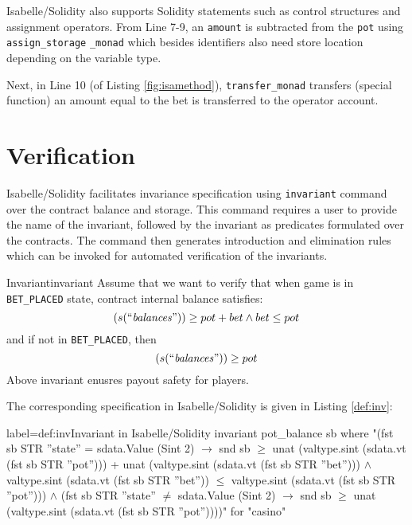 \documentclass[a4paper,UKenglish,cleveref, autoref, thm-restate]{oasics-v2021}
\begin{document}
Isabelle/Solidity also supports Solidity statements such as control structures and assignment operators. 
%
From Line 7-9, an \texttt{amount} is subtracted from the \texttt{pot} using \texttt{assign\_storage} \texttt{\_monad} which besides identifiers also need store location depending on the variable type.
%

%
Next, 
%
in Line 10 (of Listing \ref{fig:isamethod}), \texttt{transfer\_monad} transfers (special function) an amount  equal to the bet is transferred to the operator account.
\section{Verification}
%
%
%
Isabelle/Solidity facilitates invariance specification using \texttt{\color{isarblue}invariant} command over the contract balance and storage.
%
This command requires a user to provide the name of the invariant, followed by the invariant as predicates formulated over the contracts. The command then generates introduction and elimination rules which can be invoked for automated verification of the invariants.
%
\begin{Example}{Invariant}{invariant}
	Assume that we want to verify that when game is in  \texttt{BET\_PLACED} state, contract internal balance satisfies:
	\begin{equation}
		(s(\text{``$\mathit{balances}$''})) \ge pot + bet  \wedge bet \leq pot
	\end{equation}\label{eq:inv}
	and if not in \texttt{BET\_PLACED}, then 
\begin{equation}
		(s(\text{``$\mathit{balances}$''})) \ge pot 
	\end{equation}\label{eq:inv1}
Above invariant enusres payout safety for players. 
%

%
The corresponding specification in Isabelle/Solidity is given in Listing \ref{def:inv}:
\begin{isabelle}{label={def:inv}}{Invariant in Isabelle/Solidity}
invariant pot_balance sb where
    "(fst sb STR ''state'' = sdata.Value (Sint 2)
      $\longrightarrow$ snd sb $\geq$ unat (valtype.sint (sdata.vt (fst sb STR ''pot''))) 
		+ unat (valtype.sint (sdata.vt (fst sb STR ''bet'')))
        $\wedge$ valtype.sint (sdata.vt (fst sb STR ''bet'')) $\leq$ 
		valtype.sint (sdata.vt (fst sb STR ''pot''))) $\wedge$
    (fst sb STR ''state'' $\neq$ sdata.Value (Sint 2)
    $\longrightarrow$  snd sb $\geq$ unat (valtype.sint (sdata.vt (fst sb STR ''pot''))))"
  for "casino"
\end{isabelle}
\end{Example}
%
\end{document}
